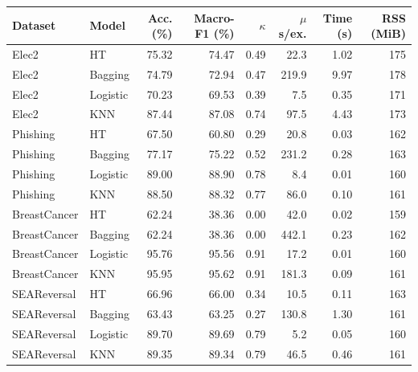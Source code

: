\begin{tabular}{llrrrrrr}
\toprule
Dataset & Model & Acc. (\%) & Macro-F1 (\%) & $\kappa$ & $\mu$s/ex. & Time (s) & RSS (MiB) \\
\midrule
Elec2 & HT & 75.32 & 74.47 & 0.49 & 22.3 & 1.02 & 175 \\
Elec2 & Bagging & 74.79 & 72.94 & 0.47 & 219.9 & 9.97 & 178 \\
Elec2 & Logistic & 70.23 & 69.53 & 0.39 & 7.5 & 0.35 & 171 \\
Elec2 & KNN & 87.44 & 87.08 & 0.74 & 97.5 & 4.43 & 173 \\
Phishing & HT & 67.50 & 60.80 & 0.29 & 20.8 & 0.03 & 162 \\
Phishing & Bagging & 77.17 & 75.22 & 0.52 & 231.2 & 0.28 & 163 \\
Phishing & Logistic & 89.00 & 88.90 & 0.78 & 8.4 & 0.01 & 160 \\
Phishing & KNN & 88.50 & 88.32 & 0.77 & 86.0 & 0.10 & 161 \\
BreastCancer & HT & 62.24 & 38.36 & 0.00 & 42.0 & 0.02 & 159 \\
BreastCancer & Bagging & 62.24 & 38.36 & 0.00 & 442.1 & 0.23 & 162 \\
BreastCancer & Logistic & 95.76 & 95.56 & 0.91 & 17.2 & 0.01 & 160 \\
BreastCancer & KNN & 95.95 & 95.62 & 0.91 & 181.3 & 0.09 & 161 \\
SEAReversal & HT & 66.96 & 66.00 & 0.34 & 10.5 & 0.11 & 163 \\
SEAReversal & Bagging & 63.43 & 63.25 & 0.27 & 130.8 & 1.30 & 161 \\
SEAReversal & Logistic & 89.70 & 89.69 & 0.79 & 5.2 & 0.05 & 160 \\
SEAReversal & KNN & 89.35 & 89.34 & 0.79 & 46.5 & 0.46 & 161 \\
\bottomrule
\end{tabular}
